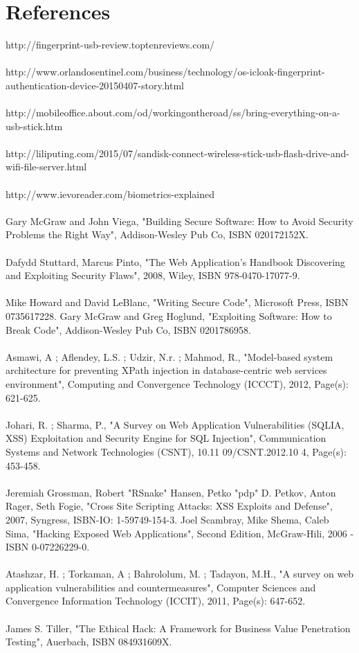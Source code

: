 \documentclass[a4paper,12pt]{article}
\begin{document}
\section{References}
http://fingerprint-usb-review.toptenreviews.com/ \\
\\
http://www.orlandosentinel.com/business/technology/os-icloak-fingerprint-authentication-device-20150407-story.html \\
\\
http://mobileoffice.about.com/od/workingontheroad/ss/bring-everything-on-a-usb-stick.htm \\
\\
http://liliputing.com/2015/07/sandisk-connect-wireless-stick-usb-flash-drive-and-wifi-file-server.html\\
\\
http://www.ievoreader.com/biometrics-explained \\
\\
Gary McGraw and John Viega, "Building Secure Software: How to Avoid Security Problems the Right Way", Addison-Wesley Pub Co, ISBN 020172152X. \\
\\
Dafydd Stuttard, Marcus Pinto, "The Web Application's Handbook Discovering and Exploiting Security Flaws", 2008, Wiley, ISBN 978-0470-17077-9. \\
\\
Mike Howard and David LeBlanc, "Writing Secure Code", Microsoft Press, ISBN 0735617228.
Gary McGraw and Greg Hoglund, "Exploiting Software: How to Break Code", Addison-Wesley Pub Co, ISBN 0201786958. \\
\\
Asmawi, A ; Aflendey, L.S. ; Udzir, N.r. ; Mahmod, R., "Model-based system architecture for preventing XPath injection in database-centric web services environment", Computing and Convergence Technology (ICCCT), 2012, Page(s): 621-625. \\
\\
Johari, R. ; Sharma, P., "A Survey on Web Application Vulnerabilities (SQLIA, XSS) Exploitation and Security Engine for SQL Injection", Communication Systems and Network Technologies (CSNT), 10.11 09/CSNT.2012.10 4, Page(s): 453-458. \\
\\
Jeremiah Grossman, Robert "RSnake" Hansen, Petko "pdp" D. Petkov, Anton Rager, Seth Fogie, "Cross Site Scripting Attacks: XSS Exploits and Defense", 2007, Syngress, ISBN-IO: 1-59749-154-3. 
Joel Scambray, Mike Shema, Caleb Sima, "Hacking Exposed Web Applications", Second Edition, McGraw-Hili, 2006 - ISBN 0-07226229-0. \\
\\
Atashzar, H. ; Torkaman, A ; Bahrololum, M. ; Tadayon, M.H., "A survey on web application vulnerabilities and countermeasures", Computer Sciences and Convergence Information Technology (ICCIT), 2011, Page(s): 647-652. \\
\\
James S. Tiller, "The Ethical Hack: A Framework for Business Value Penetration Testing", Auerbach, ISBN 084931609X.\\
\end{document}
